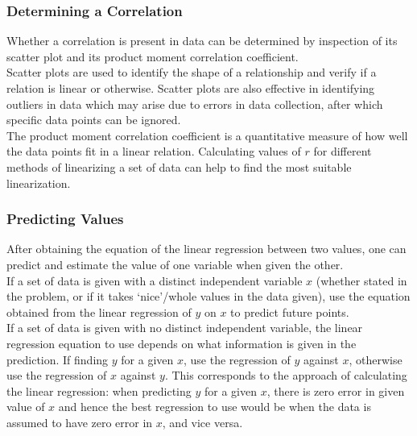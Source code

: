 \documentclass[../main]{subfiles}
\begin{document}
	\subsubsection{Determining a Correlation}

	Whether a correlation is present in data can be determined by inspection of its scatter plot and its product moment correlation coefficient. \\

	Scatter plots are used to identify the shape of a relationship and verify if a relation is linear or otherwise. Scatter plots are also effective in identifying outliers in data which may arise due to errors in data collection, after which specific data points can be ignored. \\

	The product moment correlation coefficient is a quantitative measure of how well the data points fit in a linear relation. Calculating values of \(r\) for different methods of linearizing a set of data can help to find the most suitable linearization. \\

	\subsubsection{Predicting Values}

	After obtaining the equation of the linear regression between two values, one can predict and estimate the value of one variable when given the other. \\

	If a set of data is given with a distinct independent variable \(x\) (whether stated in the problem, or if it takes `nice'/whole values in the data given), use the equation obtained from the linear regression of \(y\) on \(x\) to predict future points. \\

	If a set of data is given with no distinct independent variable, the linear regression equation to use depends on what information is given in the prediction. If finding \(y\) for a given \(x\), use the regression of \(y\) against \(x\), otherwise use the regression of \(x\) against \(y\). This corresponds to the approach of calculating the linear regression: when predicting \(y\) for a given \(x\), there is zero error in given value of \(x\) and hence the best regression  to use would be when the data is assumed to have zero error in \(x\), and vice versa.
\end{document}
